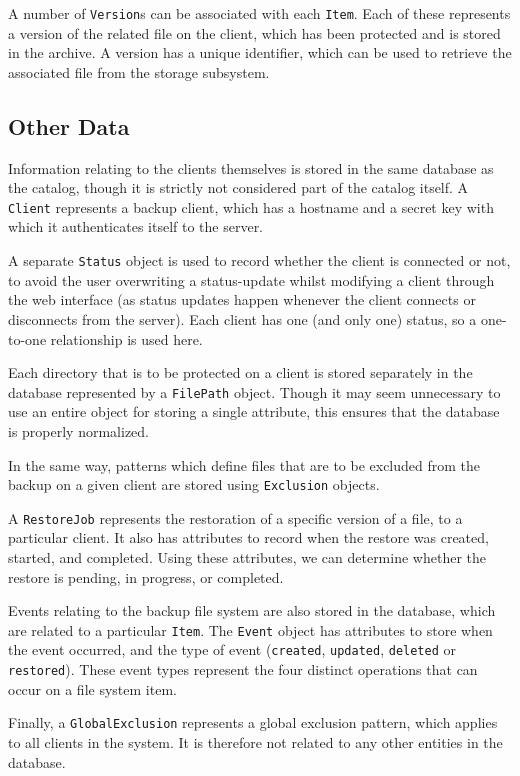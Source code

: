 A number of \verb!Version!s can be associated with each \verb!Item!. Each of
these represents a version of the related file on the client, which has been
protected and is stored in the archive. A version has a unique identifier,
which can be used to retrieve the associated file from the storage subsystem.

\subsection{Other Data}
\label{sec:design-catalog-other}

Information relating to the clients themselves is stored in the same database
as the catalog, though it is strictly not considered part of the catalog
itself. A \verb!Client! represents a backup client, which has a hostname and
a secret key with which it authenticates itself to the server.

A separate \verb!Status! object is used to record whether the client is
connected or not, to avoid the user overwriting a status-update whilst
modifying a client through the web interface (as status updates happen whenever
the client connects or disconnects from the server). Each client has one (and
only one) status, so a one-to-one relationship is used here.

Each directory that is to be protected on a client is stored separately in the
database represented by a \verb!FilePath! object. Though it may seem
unnecessary to use an entire object for storing a single attribute, this
ensures that the database is properly normalized.

In the same way, patterns which define files that are to be excluded from the
backup on a given client are stored using \verb!Exclusion! objects.

A \verb!RestoreJob! represents the restoration of a specific version of a file,
to a particular client. It also has attributes to record when the restore was
created, started, and completed. Using these attributes, we can determine
whether the restore is pending, in progress, or completed.

Events relating to the backup file system are also stored in the database,
which are related to a particular \verb!Item!. The \verb!Event! object has
attributes to store when the event occurred, and the type of event
(\verb!created!, \verb!updated!, \verb!deleted! or \verb!restored!). These
event types represent the four distinct operations that can occur on a file
system item.

Finally, a \verb!GlobalExclusion! represents a global exclusion pattern, which
applies to all clients in the system. It is therefore not related to any other
entities in the database.

